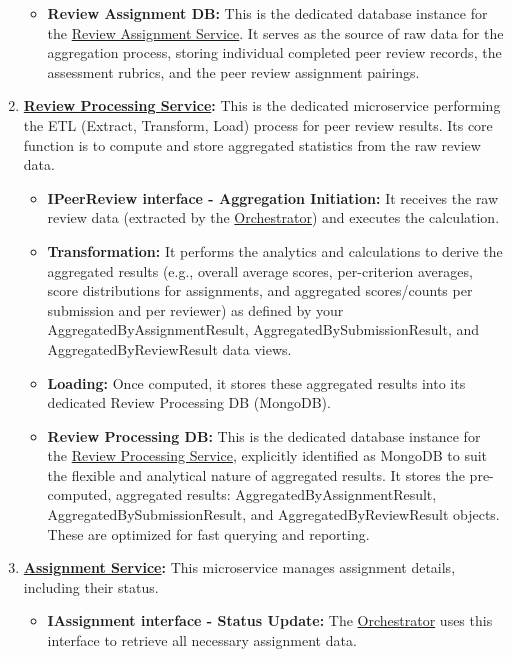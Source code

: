 \begin{enumerate}
\begin{itemize}
        \item \textbf{Review Assignment DB:} This is the dedicated database instance for the \hyperref[def:ReviewAssignmentService]{Review Assignment Service}. It serves as the source of raw data for the aggregation process, storing individual completed peer review records, the assessment rubrics, and the peer review assignment pairings. 
    \end{itemize}
    
    \item \textbf{\hyperref[def:ReviewProcessingService]{Review Processing Service}:} This is the dedicated microservice performing the ETL (Extract, Transform, Load) process for peer review results. Its core function is to compute and store aggregated statistics from the raw review data.
    \begin{itemize}
        \item \textbf{IPeerReview interface - Aggregation Initiation:} It receives the raw review data (extracted by the \hyperref[def:Orchestrator]{Orchestrator}) and executes the calculation.
        
        \item \textbf{Transformation:} It performs the analytics and calculations to derive the aggregated results (e.g., overall average scores, per-criterion averages, score distributions for assignments, and aggregated scores/counts per submission and per reviewer) as defined by your AggregatedByAssignmentResult, AggregatedBySubmissionResult, and AggregatedByReviewResult data views.
        
        \item \textbf{Loading:} Once computed, it stores these aggregated results into its dedicated Review Processing DB (MongoDB).

        \item \textbf{Review Processing DB:} This is the dedicated database instance for the \hyperref[def:ReviewProcessingService]{Review Processing Service}, explicitly identified as MongoDB to suit the flexible and analytical nature of aggregated results. It stores the pre-computed, aggregated results: AggregatedByAssignmentResult, AggregatedBySubmissionResult, and AggregatedByReviewResult objects. These are optimized for fast querying and reporting.
    \end{itemize}
    
    \item \textbf{\hyperref[def:AssignmentService]{Assignment Service}:} This microservice manages assignment details, including their status.
    \begin{itemize}
        \item \textbf{IAssignment interface - Status Update:} The \hyperref[def:Orchestrator]{Orchestrator} uses this interface to retrieve all necessary assignment data.


\end{itemize}
\end{enumerate}
